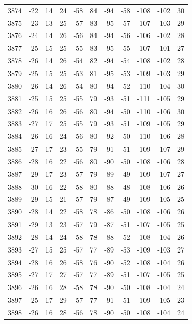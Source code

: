 \begin{table}[H]
\begin{tabular}{lllllllllll}
3874 & -22 & 14 & 24 & -58 & 84 & -94 & -58 & -108 & -102 & 30 \\
3875 & -23 & 13 & 25 & -57 & 83 & -95 & -57 & -107 & -103 & 29 \\
3876 & -24 & 14 & 26 & -56 & 84 & -94 & -56 & -106 & -102 & 28 \\
3877 & -25 & 15 & 25 & -55 & 83 & -95 & -55 & -107 & -101 & 27 \\
3878 & -26 & 14 & 26 & -54 & 82 & -94 & -54 & -108 & -102 & 28 \\
3879 & -25 & 15 & 25 & -53 & 81 & -95 & -53 & -109 & -103 & 29 \\
3880 & -26 & 14 & 26 & -54 & 80 & -94 & -52 & -110 & -104 & 30 \\
3881 & -25 & 15 & 25 & -55 & 79 & -93 & -51 & -111 & -105 & 29 \\
3882 & -26 & 16 & 26 & -56 & 80 & -94 & -50 & -110 & -106 & 30 \\
3883 & -27 & 17 & 25 & -55 & 79 & -93 & -51 & -109 & -105 & 29 \\
3884 & -26 & 16 & 24 & -56 & 80 & -92 & -50 & -110 & -106 & 28 \\
3885 & -27 & 17 & 23 & -55 & 79 & -91 & -51 & -109 & -107 & 29 \\
3886 & -28 & 16 & 22 & -56 & 80 & -90 & -50 & -108 & -106 & 28 \\
3887 & -29 & 17 & 23 & -57 & 79 & -89 & -49 & -109 & -107 & 27 \\
3888 & -30 & 16 & 22 & -58 & 80 & -88 & -48 & -108 & -106 & 26 \\
3889 & -29 & 15 & 21 & -57 & 79 & -87 & -49 & -109 & -105 & 25 \\
3890 & -28 & 14 & 22 & -58 & 78 & -86 & -50 & -108 & -106 & 26 \\
3891 & -29 & 13 & 23 & -57 & 79 & -87 & -51 & -107 & -105 & 25 \\
3892 & -28 & 14 & 24 & -58 & 78 & -88 & -52 & -108 & -104 & 26 \\
3893 & -27 & 15 & 25 & -57 & 77 & -89 & -53 & -109 & -103 & 27 \\
3894 & -28 & 16 & 26 & -58 & 76 & -90 & -52 & -108 & -104 & 26 \\
3895 & -27 & 17 & 27 & -57 & 77 & -89 & -51 & -107 & -105 & 25 \\
3896 & -26 & 16 & 28 & -58 & 78 & -90 & -50 & -108 & -104 & 24 \\
3897 & -25 & 17 & 29 & -57 & 77 & -91 & -51 & -109 & -105 & 23 \\
3898 & -26 & 16 & 28 & -56 & 78 & -90 & -50 & -108 & -104 & 24 \\

\end{tabular}
\end{table}
